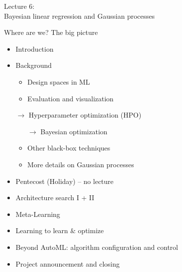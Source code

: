 
\newcommand{\bSigma}{\bm{\Sigma}}
\newcommand{\bmu}{\bm{\mu}}
\renewcommand{\bx}{\bm{x}}
\newcommand{\by}{\bm{y}}
\newcommand{\bX}{\bm{X}}
\newcommand{\bI}{\bm{I}}
\newcommand{\bw}{\bm{w}}
\newcommand{\ba}{\bm{a}}
\newcommand{\bb}{\bm{b}}
\newcommand{\bk}{\bm{k}}  
\newcommand{\inv}{^{-1}}

\renewcommand{\norm}{{\mathcal{N}}}

\renewcommand\transpose{^{\textrm{\tiny{\sf{T}}}}}


\begin{frame}[c]{}

\centering
\huge
Lecture 6:\\
Bayesian linear regression and Gaussian processes
\end{frame}
\begin{frame}[c]{Where are we? The big picture}

\begin{itemize}
	\item Introduction
	\item Background
	\begin{itemize}
		\item Design spaces in ML
		\item Evaluation and visualization
	\end{itemize}
	\item[$\to$] Hyperparameter optimization (HPO)
	\begin{itemize}
		\item[$\to$] Bayesian optimization
		\item Other black-box techniques
		\item More details on Gaussian processes
	\end{itemize}
	\item Pentecost (Holiday) -- no lecture
	\item Architecture search I + II
	\item Meta-Learning
	\item Learning to learn $\&$ optimize
	\item Beyond AutoML: algorithm configuration and control
	\item Project announcement and closing
\end{itemize}

\end{frame}

